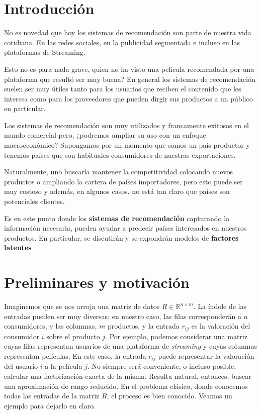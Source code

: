 \section{Introducción}
\noindent
No es novedad  que hoy los sistemas de recomendación son parte de nuestra vida cotidiana. En las redes sociales, en la publicidad segmentada e incluso en las plataformas de Streaming. 

Esto no es para nada grave, quien no ha visto una película recomendada por una plataforma que resultó ser muy buena? En general los sistemas de recomendación suelen ser muy útiles tanto para los usuarios que reciben el contenido que les interesa como para los proveedores que pueden dirgir sus productos a un público en particular.

Los sistemas de recomendación son muy utilizados y francamente exitosos en el mundo comercial pero, ¿podremos ampliar su uso con un enfoque macroeconómico? Supongamos por un momento que somos un país productor y tenemos países que son habituales consumidores de nuestras exportaciones. 

Naturalmente, uno buscaría mantener la competitividad colocando nuevos productos o ampliando la cartera de países importadores, pero esto puede ser muy costoso y además, en algunos casos, no está tan claro que países son potenciales clientes. 

Es en este punto donde los \textbf{sistemas de recomendación} capturando la información necesaria, pueden ayudar a predecir países interesados en nuestros productos. En particular, se discutirán y se expondrán modelos de \textbf{factores latentes} 

\section{Preliminares y motivación}

Imaginemos que se nos arroja una matriz de datos $R\in\mathbb{R}^{n\times m}$. La índole de las entradas pueden ser muy diversas; en nuestro caso, las filas corresponderán a $n$ consumidores, y las columnas, $m$ productos, y la entrada $r_{ij}$ es la valoración del consumidor $i$ sobre el producto $j$. Por ejemplo, podemos considerar una matriz cuyas filas representan usuarios de una plataforma de \textit{streaming} y cuyas columnas representan películas. En este caso, la entrada $r_{ij}$ puede representar la valoración del usuario $i$ a la película $j$. No siempre será conveniente, o incluso posible, calcular una factorización exacta de la misma. Resulta natural, entonces, buscar una aproximación de rango reducido. En el problema clásico, donde conocemos todas las entradas de la matriz $R$, el proceso es bien conocido. Veamos un ejemplo para dejarlo en claro.

